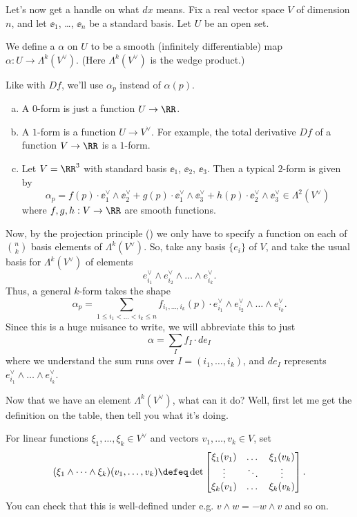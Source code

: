 Let's now get a handle on what $dx$ means.
Fix a real vector space $V$ of dimension $n$,
and let $\ee_1$, \dots, $\ee_n$ be a standard basis.
Let $U$ be an open set.

\begin{definition}
	We define a  $\alpha$ on $U$
	to be a smooth (infinitely differentiable) map
	$\alpha : U \to \Lambda^k(V^\vee)$.
	(Here $\Lambda^k(V^\vee)$ is the wedge product.)
\end{definition}

Like with $Df$, we'll use $\alpha_p$ instead of $\alpha(p)$.

\begin{example}
	[$k$-forms for $k=0,1$]
	\listhack
	\begin{enumerate}[(a)]
		\item A $0$-form is just a function $U \to \RR$.
		\item A $1$-form is a function $U \to V^\vee$.
		For example,
		the total derivative $Df$ of a function $V \to \RR$ is a $1$-form.
		\item Let $V = \RR^3$ with standard basis $\ee_1$, $\ee_2$, $\ee_3$.
		Then a typical $2$-form is given by
		\[
			\alpha_p
			=
			f(p) \cdot \ee_1^\vee \wedge \ee_2^\vee
			+ g(p) \cdot \ee_1^\vee \wedge \ee_3^\vee
			+ h(p) \cdot \ee_2^\vee \wedge \ee_3^\vee
			\in \Lambda^2(V^\vee)
		\]
		where $f,g,h : V \to \RR$ are smooth functions.
	\end{enumerate}
\end{example}

Now, by the projection principle () we only have to specify
a function on each of $\binom nk$ basis elements of $\Lambda^k(V^\vee)$.
So, take any basis $\{e_i\}$ of $V$, and 
take the usual basis for $\Lambda^k(V^\vee)$ of elements
\[ e_{i_1}^\vee \wedge e_{i_2}^\vee \wedge \dots \wedge e_{i_k}^\vee. \]
Thus, a general $k$-form takes the shape
\[ \alpha_p = \sum_{1 \le i_1 < \dots < i_k \le n} 
	f_{i_1, \dots, i_k}(p) \cdot
	e_{i_1}^\vee \wedge e_{i_2}^\vee \wedge \dots \wedge e_{i_k}^\vee. \]
Since this is a huge nuisance to write, we will abbreviate this to just
\[ \alpha = \sum_I f_I \cdot de_I \]
where we understand the sum runs over $I = (i_1, \dots, i_k)$,
and $de_I$ represents $e_{i_1}^\vee \wedge \dots \wedge e_{i_k}^\vee$.

Now that we have an element $\Lambda^k(V^\vee)$, what can it do?
Well, first let me get the definition on the table, then tell you what it's doing.
\begin{definition}
	For linear functions $\xi_1, \dots, \xi_k \in V^\vee$
	and vectors $v_1, \dots, v_k \in V$, set
	\[
		(\xi_1 \wedge \dots \wedge \xi_k)(v_1, \dots, v_k)
		\defeq
		\det
		\begin{bmatrix}
			\xi_1(v_1) & \dots & \xi_1(v_k) \\
			\vdots & \ddots & \vdots \\
			\xi_k(v_1) & \dots & \xi_k(v_k)
		\end{bmatrix}.
	\]
	You can check that this is well-defined
	under e.g. $v \wedge w = -w \wedge v$ and so on.
\end{definition}


